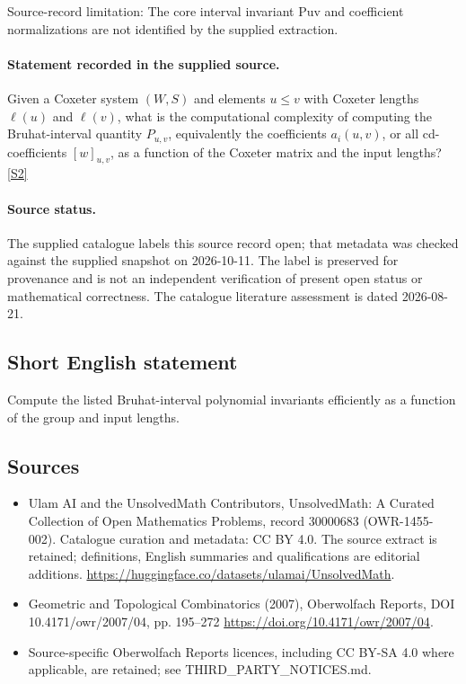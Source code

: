 \documentclass[11pt]{article}
\begin{document}
Source-record limitation: The core interval invariant Puv and coefficient normalizations are not identified by the supplied extraction.
\paragraph{Statement recorded in the supplied source.}
Given a Coxeter system $(W,S)$ and elements $u\leq v$ with Coxeter lengths $\ell(u)$ and $\ell(v)$, what is the computational complexity of computing the Bruhat-interval quantity $P_{u,v}$, equivalently the coefficients $a_i(u,v)$, or all cd-coefficients $[w]_{u,v}$, as a function of the Coxeter matrix and the input lengths? \href{https://doi.org/10.4171/owr/2007/04}{[S2]}
\paragraph{Source status.}
The supplied catalogue labels this source record open; that metadata was checked against the supplied snapshot on 2026-10-11. The label is preserved for provenance and is not an independent verification of present open status or mathematical correctness. The catalogue literature assessment is dated 2026-08-21.
\subsection{Short English statement}
Compute the listed Bruhat-interval polynomial invariants efficiently as a function of the group and input lengths.
\subsection{Sources}
\begin{itemize}
\item[S1] Ulam AI and the UnsolvedMath Contributors, UnsolvedMath: A Curated Collection of Open Mathematics Problems, record 30000683 (OWR-1455-002). Catalogue curation and metadata: CC BY 4.0. The source extract is retained; definitions, English summaries and qualifications are editorial additions.
\url{https://huggingface.co/datasets/ulamai/UnsolvedMath}.
\item[S2] Geometric and Topological Combinatorics (2007), Oberwolfach Reports, DOI 10.4171/owr/2007/04, pp. 195--272
\url{https://doi.org/10.4171/owr/2007/04}.
\item Source-specific Oberwolfach Reports licences, including CC BY-SA 4.0 where applicable, are retained; see THIRD\_PARTY\_NOTICES.md.
\end{itemize}
\end{document}
